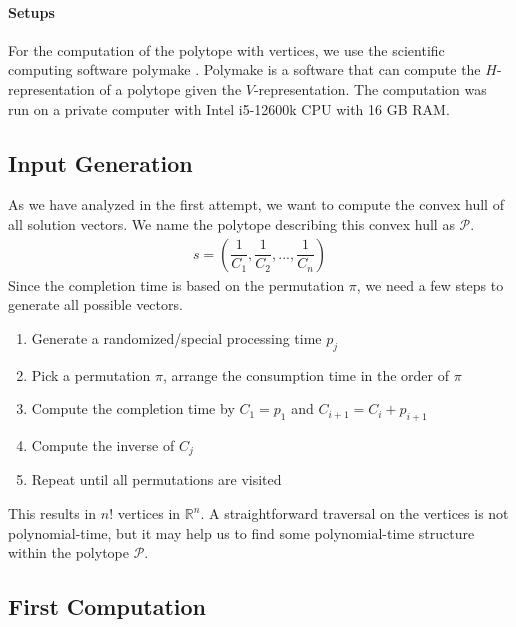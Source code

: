\documentclass[12pt,letterpaper]{article}
\newcommand*{\R}{\mathbb{R}}
\newcommand{\Poly}{\mathcal{P}}
\begin{document}
\paragraph{Setups}
For the computation of the polytope with vertices, we use the scientific computing software polymake \cite{assarf2017computing}.
Polymake is a software that can compute the $H$-representation of a polytope given the $V$-representation. 
The computation was run on a private computer with Intel i5-12600k CPU with 16 GB RAM. 


\subsection{Input Generation}
As we have analyzed in the first attempt, we want to compute the convex hull of all solution vectors.
We name the polytope describing this convex hull as $\Poly$.
\begin{align*}
 s = \left( \dfrac{1}{C_1}, \dfrac{1}{C_2}, ..., \dfrac{1}{C_n} \right)
\end{align*}
Since the completion time is based on the permutation $\pi$, we need a few steps to generate all possible 
vectors. 
\begin{enumerate}
    \item Generate a randomized/special processing time $p_j$
    \item Pick a permutation $\pi$, arrange the consumption time in the order of $\pi$
    \item Compute the completion time by $C_1 = p_1$ and $C_{i+1} = C_i + p_{i+1}$
    \item Compute the inverse of $C_j$
    \item Repeat until all permutations are visited
\end{enumerate}
This results in $n!$ vertices in $\R^n$. A straightforward traversal on the vertices is not 
polynomial-time, but it may help us to find some polynomial-time structure within the polytope $\Poly$.

\subsection{First Computation}
\end{document}
